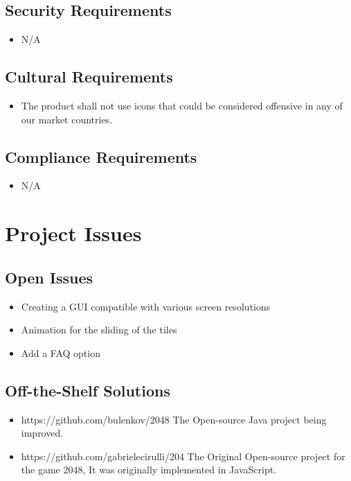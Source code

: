 \documentclass[12pt]{article}
\begin{document}
\subsection{Security Requirements}
\begin{itemize}
\item N/A
\end{itemize}

\subsection{Cultural Requirements}
\begin{itemize}
\item The product shall not use icons that could be considered offensive in any of our market countries.
\end{itemize}

\subsection{Compliance Requirements}
\begin{itemize}
\item N/A
\end{itemize}

\section{Project Issues}
\subsection{Open Issues}
\begin{itemize}
	\item Creating a GUI compatible with various screen resolutions
	\item Animation for the sliding of the tiles
	\item Add a FAQ option
\end{itemize}

\subsection{Off-the-Shelf Solutions}
\begin{itemize}
	\item https://github.com/bulenkov/2048 The Open-source Java project being
	improved.
	\item https://github.com/gabrielecirulli/204 The Original Open-source
	project for the game 2048, It was originally implemented in JavaScript.
\end{itemize}
\end{document}
